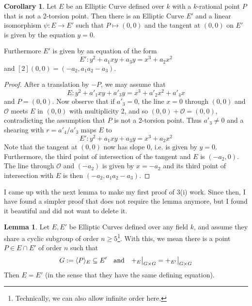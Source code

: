 \documentclass{scrartcl}
\renewcommand{\O}{\mathcal{O}}
\newcommand\restr[2]{{
    \left.\kern-\nulldelimiterspace
    #1
    \vphantom{\big|}
    \right|_{#2}
}}
\theoremstyle{definition}
\newtheorem{lemma}[subsection]{Lemma}
\newtheorem{corollary}[subsection]{Corollary}
\begin{document}
\begin{corollary}
    \label{prop:point_normalization}
    Let $E$ be an Elliptic Curve defined over $k$ with a $k$-rational point $P$ that is not a 2-torsion point.
    Then there is an Elliptic Curve $E'$ and a linear isomorphism $\psi: E \to E'$ such that $P \mapsto (0, 0)$ and the tangent at $(0, 0)$ on $E'$ is given by the equation $y = 0$.
    
    Furthermore $E'$ is given by an equation of the form
    \begin{equation*}
        E': y^2 + a_1 x y + a_3 y = x^3 + a_2 x^2
    \end{equation*}
    and $[2](0, 0) = (-a_2, a_1 a_2 - a_3)$.
\end{corollary}
\begin{proof}
    After a translation by $-P$, we may assume that
    \begin{equation*}
        E: y^2 + a'_1 x y + a'_3 y = x^3 + a'_2 x^2 + a'_4 x
    \end{equation*}
    and $P = (0, 0)$.
    Now observe that if $a'_3 = 0$, the line $x = 0$ through $(0, 0)$ and $\O$ meets $E$ in $(0, 0)$ with multiplicity 2, and so $(0, 0) + \O = (0, 0)$, contradicting the assumption that $P$ is not a 2-torsion point.
    Thus $a'_3 \neq 0$ and a shearing with $r = a'_4 / a'_3$ maps $E$ to
    \begin{equation*}
        E': y^2 + a_1 x y + a_3 y = x^3 + a_2 x^2
    \end{equation*}
    Note that the tangent at $(0, 0)$ now has slope $0$, i.e. is given by $y = 0$.
    Furthermore, the third point of intersection of the tangent and $E$ is $(-a_2, 0)$.
    The line through $\O$ and $(-a_2)$ is given by $x = -a_2$ and its third point of intersection with $E$ is then $(-a_2, a_1a_2 - a_3)$. 
\end{proof}
I came up with the next lemma to make my first proof of 3(i) work.
Since then, I have found a simpler proof that does not require the lemma anymore, but I found it beautiful and did not want to delete it.
\begin{lemma}
    \label{prop:share_subgroup_equal}
    Let $E, E'$ be Elliptic Curves defined over any field $k$, and assume they share a cyclic subgroup of order $n \geq 5$\footnote{Technically, we can also allow infinite order here.}.
    With this, we mean there is a point $P \in E \cap E'$ of order $n$ such that
    \begin{equation*}
        G := \langle P \rangle_E \subseteq E' \quad \text{and} \quad \restr{+_E}{G \times G} = \restr{+_{E'}}{G \times G}
    \end{equation*}
    Then $E = E'$ (in the sense that they have the same defining equation).
\end{lemma}
\end{document}
